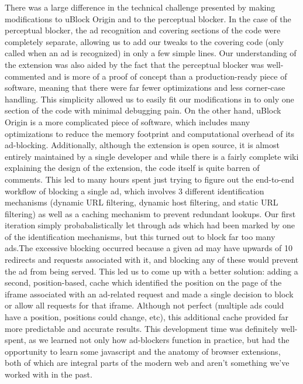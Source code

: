 There was a large difference in the technical challenge presented by making modifications to uBlock Origin and to the perceptual blocker.
In the case of the perceptual blocker, the ad recognition and covering sections of the code were completely separate, allowing us to add our tweaks to the covering code (only called when an ad is recognized) in only a few simple lines.
Our understanding of the extension was also aided by the fact that the perceptual blocker was well-commented and is more of a proof of concept than a production-ready piece of software, meaning that there were far fewer optimizations and less corner-case handling.
This simplicity allowed us to easily fit our modifications in to only one section of the code with minimal debugging pain.
On the other hand, uBlock Origin is a more complicated piece of software, which includes many optimizations to reduce the memory footprint and computational overhead of its ad-blocking.
Additionally, although the extension is open source, it is almost entirely maintained by a single developer and while there is a fairly complete wiki explaining the design of the extension, the code itself is quite barren of comments.
This led to many hours spent just trying to figure out the end-to-end workflow of blocking a single ad, which involves 3 different identification mechanisms (dynamic URL filtering, dynamic host filtering, and static URL filtering) as well as a caching mechanism to prevent redundant lookups.
Our first iteration simply probabalistically let through ads which had been marked by one of the identification mechanisms, but this turned out to block far too many ads.The excessive blocking occurred because a given ad may have upwards of 10 redirects and requests associated with it, and blocking any of these would prevent the ad from being served.
This led us to come up with a better solution: adding a second, position-based, cache which identified the position on the page of the iframe associated with an ad-related request and made a single decision to block or allow all requests for that iframe.
Although not perfect (multiple ads could have a position, positions could change, etc), this additional cache provided far more predictable and accurate results.
This development time was definitely well-spent, as we learned not only how ad-blockers function in practice, but had the opportunity to learn some javascript and the anatomy of browser extensions, both of which are integral parts of the modern web and aren't something we've worked with in the past.

